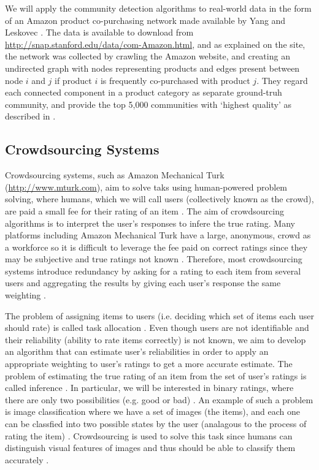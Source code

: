 \documentclass[12pt]{article}
\numberwithin{equation}{section}
\begin{document}
We will apply the community detection algorithms to real-world data in the form of an Amazon product co-purchasing network made available by Yang and Leskovec \cite{YL12}. The data is available to download from \url{http://snap.stanford.edu/data/com-Amazon.html}, and as explained on the site, the network was collected by crawling the Amazon website, and creating an undirected graph with nodes representing products and edges present between node $i$ and $j$ if product $i$ is frequently co-purchased with product $j$. They regard each connected component in a product category as separate ground-truh community, and provide the top 5,000 communities with `highest quality' as described in \cite{YL12}. 

\subsection{Crowdsourcing Systems}
\label{sec:background;subsec:crowdsourcingSystems}

Crowdsourcing systems, such as Amazon Mechanical Turk (\url{http://www.mturk.com}), aim to solve taks using human-powered problem solving, where humans, which we will call users (collectively known as the crowd), are paid a small fee for their rating of an item \cite{KOS13,EHR12}. The aim of crowdsourcing algorithms is to interpret the user's responses to infere the true rating. Many platforms including Amazon Mechanical Turk have a large, anonymous, crowd as a workforce so it is difficult to leverage the fee paid on correct ratings since they may be subjective and true ratings not known \cite{KOS13}. Therefore, most crowdsourcing systems introduce redundancy by asking for a rating to each item from several users and aggregating the results by giving each user's response the same weighting \cite{GKM11,KOS13,DDK+13}.

The problem of assigning items to users (i.e. deciding which set of items each user should rate) is called task allocation \cite{KOS13}. Even though users are not identifiable and their reliability (ability to rate items correctly) is not known, we aim to develop an algorithm that can estimate user's reliabilities in order to apply an appropriate weighting to user's ratings to get a more accurate estimate. The problem of estimating the true rating of an item from the set of user's ratings is called inference \cite{KOS13}. In particular, we will be interested in binary ratings, where there are only two possibilities (e.g. good or bad) \cite{GKM11}. An example of such a problem is image classification where we have a set of images (the items), and each one can be classfied into two possible states by the user (analagous to the process of rating the item) \cite{KOS13, DKF13}. Crowdsourcing is used to solve this task since humans can distinguish visual features of images and thus should be able to classify them accurately \cite{DKF13}.
\end{document}
